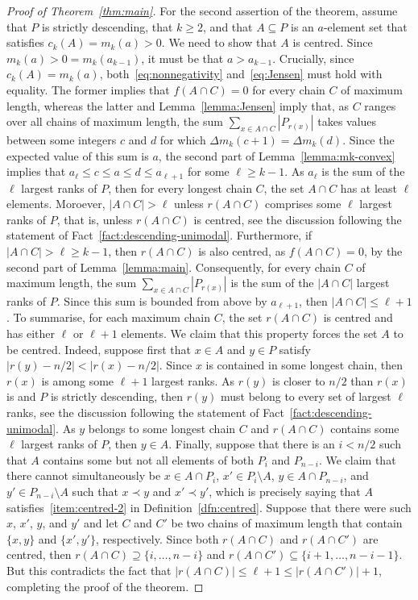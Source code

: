 \documentclass[11pt,a4paper,reqno]{amsart}
\numberwithin{claim}{thm}
\theoremstyle{definition}
\renewcommand{\le}{\leqslant}
\renewcommand{\ge}{\geqslant}
\begin{document}
\begin{proof}[Proof of Theorem~\ref{thm:main}]
  For the second assertion of the theorem, assume that $P$ is strictly descending, that $k \ge 2$, and that $A \subseteq P$ is an $a$-element set that satisfies $c_k(A) = m_k(a) > 0$. We need to show that $A$ is centred. Since $m_k(a) > 0 = m_k(a_{k-1})$, it must be that $a > a_{k-1}$. Crucially, since $c_k(A) = m_k(a)$, both~\eqref{eq:nonnegativity} and~\eqref{eq:Jensen} must hold with equality. The former implies that $f(A \cap C) = 0$ for every chain $C$ of maximum length, whereas the latter and Lemma~\ref{lemma:Jensen} imply that, as $C$ ranges over all chains of maximum length, the sum $\sum_{x \in A \cap C} |P_{r(x)}|$ takes values between some integers $c$ and $d$ for which $\Delta m_k(c+1) = \Delta m_k(d)$. Since the expected value of this sum is $a$, the second part of Lemma~\ref{lemma:mk-convex} implies that $a_\ell \le c \le a \le d \le a_{\ell+1}$ for some $\ell \ge k-1$. As $a_\ell$ is the sum of the $\ell$ largest ranks of $P$, then for every longest chain $C$, the set $A \cap C$ has at least $\ell$ elements. Moroever, $|A \cap C| > \ell$ unless $r(A \cap C)$ comprises some $\ell$ largest ranks of $P$, that is, unless $r(A \cap C)$ is centred, see the discussion following the statement of Fact~\ref{fact:descending-unimodal}. Furthermore, if $|A \cap C| > \ell \ge k-1$, then $r(A \cap C)$ is also centred, as $f(A \cap C) = 0$, by the second part of Lemma~\ref{lemma:main}. Consequently, for every chain $C$ of maximum length, the sum $\sum_{x \in A \cap C} |P_{r(x)}|$ is the sum of the $|A \cap C|$ largest ranks of $P$. Since this sum is bounded from above by $a_{\ell+1}$, then $|A \cap C| \le \ell+1$. To summarise, for each maximum chain $C$, the set $r(A \cap C)$ is centred and has either $\ell$ or $\ell+1$ elements. We claim that this property forces the set $A$ to be centred. Indeed, suppose first that $x \in A$ and $y \in P$ satisfy $|r(y) - n/2| < |r(x) - n/2|$. Since $x$ is contained in some longest chain, then $r(x)$ is among some $\ell+1$ largest ranks. As $r(y)$ is closer to $n/2$ than $r(x)$ is and $P$ is strictly descending, then $r(y)$ must belong to every set of largest $\ell$ ranks, see the discussion following the statement of Fact~\ref{fact:descending-unimodal}. As $y$ belongs to some longest chain $C$ and $r(A \cap C)$ contains some $\ell$ largest ranks of $P$, then $y \in A$. Finally, suppose that there is an $i < n/2$ such that $A$ contains some but not all elements of both $P_i$ and $P_{n-i}$. We claim that there cannot simultaneously be $x \in A \cap P_i$, $x' \in P_i \setminus A$, $y \in A \cap  P_{n-i}$, and $y' \in P_{n-i} \setminus A$ such that $x \prec y$ and $x' \prec y'$, which is precisely saying that $A$ satisfies~\ref{item:centred-2} in Definition~\ref{dfn:centred}. Suppose that there were such $x$, $x'$, $y$, and $y'$ and let $C$ and $C'$ be two chains of maximum length that contain $\{x,y\}$ and $\{x',y'\}$, respectively. Since both $r(A \cap C)$ and $r(A \cap C')$ are centred, then $r(A \cap C) \supseteq \{i, \dotsc, n-i\}$ and $r(A \cap C') \subseteq \{i+1, \dotsc, n-i-1\}$. But this contradicts the fact that $|r(A \cap C)| \le \ell+1 \le |r(A \cap C')| + 1$, completing the proof of the theorem.  
\end{proof}
\end{document}
